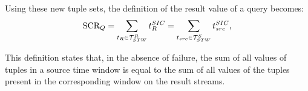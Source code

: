 Using these new tuple sets, the definition of the result \sic value of a query becomes:
\begin{align} 
		\textrm{SCR}_Q = \sum_{t_R \in \mathcal{T}^R_{STW}} t_{R}^{SIC} = \sum_{t_{src} \in \mathcal{T}^{S}_{STW}}
		t_{src}^{SIC},
\end{align}

This definition states that, in the absence of failure, the sum of all \sic values of tuples in a source
time window is equal to the sum of all \sic values of the tuples present in the corresponding window on
the result streams.
% 
% 
% 
